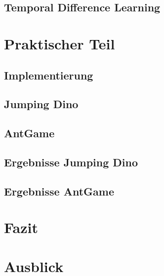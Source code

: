 \documentclass[12pt]{scrartcl}
\numberwithin{equation}{section}
\begin{document}
	\subsection{Temporal Difference Learning}\label{sec:TD}
	

\section{Praktischer Teil}
	
	\subsection{Implementierung}
	
	\subsection{Jumping Dino}
	
	\subsection{AntGame}
	
	\subsection{Ergebnisse Jumping Dino}
	
	\subsection{Ergebnisse AntGame}
	
\section{Fazit}
\section{Ausblick}

\pagebreak

\pagebreak


\end{document}

